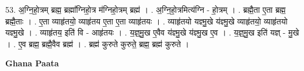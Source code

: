 \documentclass[17pt]{extarticle}
\begin{document}
53. अ॒ग्नि॒हो॒त्रम् ब्रह्म॒ ब्रह्मा᳚ग्निहो॒त्र म॑ग्निहो॒त्रम् ब्रह्म॑ । . अ॒ग्नि॒हो॒त्रमित्य॑ग्नि - हो॒त्रम् । . ब्रह्मै॒ता ए॒ता ब्रह्म॒ ब्रह्मै॒ताः । . ए॒ता व्याहृ॑तयो॒ व्याहृ॑तय ए॒ता ए॒ता व्याहृ॑तयः । . व्याहृ॑तयो यज्ञ्मु॒खे य॑ज्ञ्मु॒खे व्याहृ॑तयो॒ व्याहृ॑तयो यज्ञ्मु॒खे । . व्याहृ॑तय॒ इति॑ वि - आहृ॑तयः । . य॒ज्ञ्॒मु॒ख ए॒वैव य॑ज्ञ्मु॒खे य॑ज्ञ्मु॒ख ए॒व । . य॒ज्ञ्॒मु॒ख इति॑ यज्ञ् - मु॒खे । . ए॒व ब्रह्म॒ ब्रह्मै॒वैव ब्रह्म॑ । . ब्रह्म॑ कुरुते कुरुते॒ ब्रह्म॒ ब्रह्म॑ कुरुते । \newline

\textbf{Ghana Paata } \newline
\end{document}
